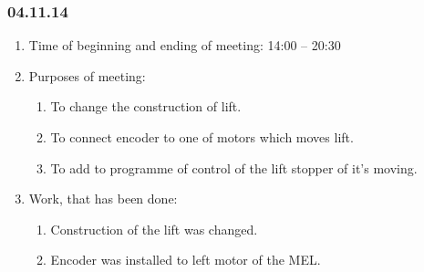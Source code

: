 
\subsubsection{04.11.14}

\begin{enumerate}
	\item Time of beginning and ending of meeting:
	14:00 – 20:30
	\item Purposes of meeting:
	\begin{enumerate}
	  \item To change the construction of lift.
	  
	  \item To connect encoder to one of motors which moves lift.
	  
	  \item To add to programme of control of the lift stopper of it's moving.
	  
    \end{enumerate}
    
	\item Work, that has been done:
	\begin{enumerate}
	  \item Construction of the lift was changed.
      
      \item Encoder was installed to left motor of the MEL.
      

\end{enumerate}
\end{enumerate}
